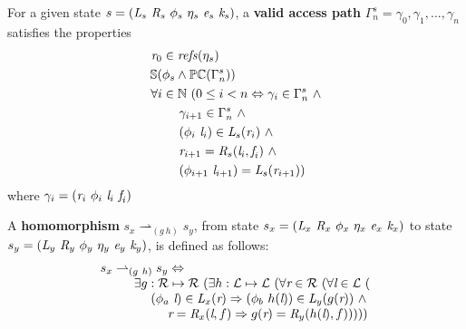 \begin{definition}
For a given state $s= ( \cfgnt{L}_s\ \cfgnt{R}_s\ \phi_s\ \eta_s\ \cfgnt{e}_s\ \cfgnt{k}_s )$, a \textbf{valid access path} $\Gamma_n^s = \gamma_0,\gamma_1,...,\gamma_n$ satisfies the properties
\begin{align*}
\cfgnt{r}_0 &\in \mathit{refs}(\eta_s) \\
\mathbb{S}(&\phi_s \wedge \mathbb{PC}(\Gamma_n^s)) \\
\forall i & \in \mathbb{N}\ ( 0 \leq i < n \Leftrightarrow \gamma_i \in \Gamma_n^s\  \wedge\\
&\ \ \ \  \gamma_{i+1} \in \Gamma_n^s\  \wedge\\
&\ \ \ \  (\phi_i\ \cfgnt{l}_i)\in \cfgnt{L}_s(\cfgnt{r}_i)\ \wedge \\
&\ \ \ \  \cfgnt{r}_{i+1} = \cfgnt{R}_s(\cfgnt{l}_i,\cfgnt{f}_i)\ \wedge\\
&\ \ \ \ (\phi_{i+1}\ \cfgnt{l}_{i+1}) = \cfgnt{L}_s(\cfgnt{r}_{i+1}) )
\end{align*}
where $\gamma_i = (\emph{r}_i\ \phi_i\ \emph{l}_i\ \emph{f}_i)$
\end{definition}

\begin{definition}
A \textbf{homomorphism} $s_x \rightharpoonup_{(g\ h)} s_y$, from state $s_x = ( \cfgnt{L}_x\ \cfgnt{R}_x\ \phi_x\ \eta_x\ \cfgnt{e}_x\ \cfgnt{k}_x )$ to state $s_y = ( \cfgnt{L}_y\ \cfgnt{R}_y\ \phi_y\ \eta_y\ \cfgnt{e}_y\ \cfgnt{k}_y )$, is defined as follows: 
$$
\begin{array}{l}
 s_x \rightharpoonup_{(g\ h)} s_y \Leftrightarrow \\
\ \ \ \ \ \ \ \ \exists g:\mathcal{R} \mapsto \mathcal{R}\ ( \exists h: \mathcal{L} \mapsto \mathcal{L}\ (\forall \cfgnt{r} \in \mathcal{R}\ (\forall \cfgnt{l} \in \mathcal{L}\ ( \\ 
\ \ \ \ \ \ \ \ \ \ \ \ (\phi_a\ \cfgnt{l}) \in \cfgnt{L}_x(\cfgnt{r}) \Rightarrow (\phi_b\ h(\cfgnt{l}))\in \cfgnt{L}_y(g(\cfgnt{r}))\ \wedge \\
\ \ \ \ \ \ \ \ \ \ \ \ \ \ \ \ \cfgnt{r} = \cfgnt{R}_x(\cfgnt{l},f) \Rightarrow g(\cfgnt{r}) = \cfgnt{R}_y(h(\cfgnt{l}),f) )) )) 
\end{array}
$$
\end{definition}

